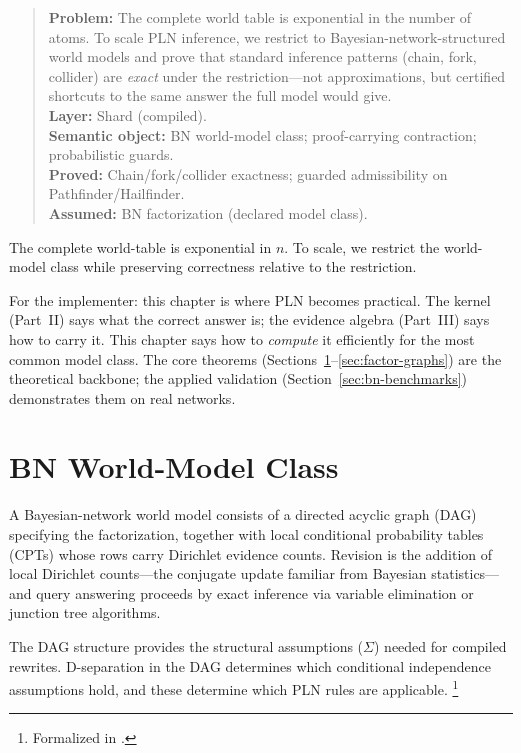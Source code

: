 \documentclass[11pt,openany]{report}
\begin{document}
\begin{quote}\small
\textbf{Problem:} The complete world table is exponential in the number
of atoms.  To scale PLN inference, we restrict to Bayesian-network-structured
world models and prove that standard inference patterns (chain, fork,
collider) are \emph{exact} under the restriction---not approximations,
but certified shortcuts to the same answer the full model would give.\\[4pt]
\textbf{Layer:} Shard (compiled).\\
\textbf{Semantic object:} BN world-model class; proof-carrying contraction; probabilistic guards.\\
\textbf{Proved:} Chain/fork/collider exactness; guarded admissibility on Pathfinder/Hailfinder.\\
\textbf{Assumed:} BN factorization (declared model class).
\end{quote}

The complete world-table \JointEvidence{} is exponential in $n$.  To scale,
we restrict the world-model class while preserving correctness relative
to the restriction.

For the implementer: this chapter is where PLN becomes practical.  The
kernel (Part~II) says what the correct answer is; the evidence algebra
(Part~III) says how to carry it.  This chapter says how to
\emph{compute} it efficiently for the most common model class.  The core
theorems (Sections~\ref{sec:bn-class}--\ref{sec:factor-graphs}) are the
theoretical backbone; the applied validation
(Section~\ref{sec:bn-benchmarks}) demonstrates them on real networks.

\section{BN World-Model Class}
\label{sec:bn-class}

A Bayesian-network world model consists of a directed acyclic graph (DAG)
specifying the factorization, together with local conditional probability
tables (CPTs) whose rows carry Dirichlet evidence counts.  Revision is
the addition of local Dirichlet counts---the conjugate update familiar
from Bayesian statistics---and query answering proceeds by exact inference
via variable elimination or junction tree algorithms.

The DAG structure provides the structural assumptions ($\Sigma$) needed
for compiled rewrites.  D-separation in the DAG determines which
conditional independence assumptions hold, and these determine which
PLN rules are applicable.%
\footnote{Formalized in .}
\end{document}
